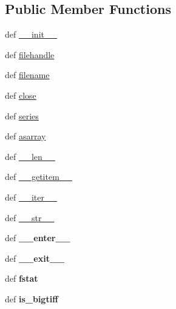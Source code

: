 \subsection*{Public Member Functions}
\begin{DoxyCompactItemize}
\item 
def \hyperlink{classtifffile_1_1TiffFile_a2cacc91d936a85b866629e1004db56be}{\-\_\-\-\_\-init\-\_\-\-\_\-}
\item 
def \hyperlink{classtifffile_1_1TiffFile_ab60b7755da796bc24e0959901a2178f2}{filehandle}
\item 
def \hyperlink{classtifffile_1_1TiffFile_a6215683006e55ed5602df52a5596b6c2}{filename}
\item 
def \hyperlink{classtifffile_1_1TiffFile_aeee11d1813bfd5ca6684468bb771f214}{close}
\item 
def \hyperlink{classtifffile_1_1TiffFile_a774e670bd07b1bfc5f06ccd52a6a800a}{series}
\item 
def \hyperlink{classtifffile_1_1TiffFile_a6ffb819278ba899e42fd6253508bcb8a}{asarray}
\item 
def \hyperlink{classtifffile_1_1TiffFile_a9e400571d3475d5e268893877136bf24}{\-\_\-\-\_\-len\-\_\-\-\_\-}
\item 
def \hyperlink{classtifffile_1_1TiffFile_addf7084c3ea60f31fa8f19b4db5284a4}{\-\_\-\-\_\-getitem\-\_\-\-\_\-}
\item 
def \hyperlink{classtifffile_1_1TiffFile_a12847e8b06cb8c2c4b9233377eaec539}{\-\_\-\-\_\-iter\-\_\-\-\_\-}
\item 
def \hyperlink{classtifffile_1_1TiffFile_a090018b858ceac412aafeae6c6c29a89}{\-\_\-\-\_\-str\-\_\-\-\_\-}
\item 
\hypertarget{classtifffile_1_1TiffFile_a8af0d38a6308893259f009a848dc8f55}{def {\bfseries \-\_\-\-\_\-enter\-\_\-\-\_\-}}\label{classtifffile_1_1TiffFile_a8af0d38a6308893259f009a848dc8f55}

\item 
\hypertarget{classtifffile_1_1TiffFile_a86dacb85206d356ff3da93bec1ed0848}{def {\bfseries \-\_\-\-\_\-exit\-\_\-\-\_\-}}\label{classtifffile_1_1TiffFile_a86dacb85206d356ff3da93bec1ed0848}

\item 
\hypertarget{classtifffile_1_1TiffFile_a930a149ecaf1ad9409c4dbad1d9c2d60}{def {\bfseries fstat}}\label{classtifffile_1_1TiffFile_a930a149ecaf1ad9409c4dbad1d9c2d60}

\item 
\hypertarget{classtifffile_1_1TiffFile_af5d955e517896fee54d9fe3d9e9f266c}{def {\bfseries is\-\_\-bigtiff}}\label{classtifffile_1_1TiffFile_af5d955e517896fee54d9fe3d9e9f266c}


\end{DoxyCompactItemize}
